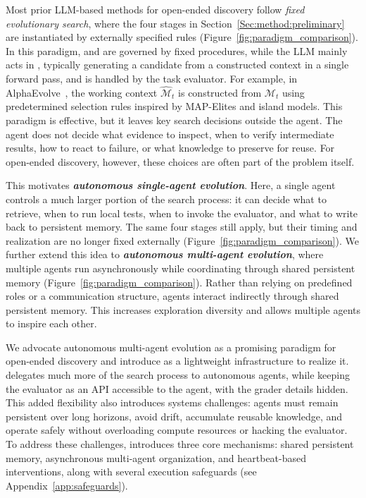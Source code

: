 

Most prior LLM-based methods for open-ended discovery follow \emph{fixed evolutionary search}, where the four stages in Section~\ref{Sec:method:preliminary} are instantiated by externally specified rules (Figure~\ref{fig:paradigm_comparison}). In this paradigm,  and  are governed by fixed procedures, while the LLM mainly acts in , typically generating a candidate from a constructed context in a single forward pass, and  is handled by the task evaluator. For example, in AlphaEvolve~\citep{novikov2025alphaevolve}, the working context $\hat{\mathcal{M}}_t$ is constructed from $\mathcal{M}_t$ using predetermined selection rules inspired by MAP-Elites and island models. This paradigm is effective, but it leaves key search decisions outside the agent. The agent does not decide what evidence to inspect, when to verify intermediate results, how to react to failure, or what knowledge to preserve for reuse. For open-ended discovery, however, these choices are often part of the problem itself.

This motivates \textbf{\emph{autonomous single-agent evolution}}. Here, a single agent controls a much larger portion of the search process: it can decide what to retrieve, when to run local tests, when to invoke the evaluator, and what to write back to persistent memory. The same four stages still apply, but their timing and realization are no longer fixed externally (Figure~\ref{fig:paradigm_comparison}). We further extend this idea to \textbf{\emph{autonomous multi-agent evolution}}, where multiple agents run asynchronously while coordinating through shared persistent memory (Figure~\ref{fig:paradigm_comparison}). Rather than relying on predefined roles or a communication structure, agents interact indirectly through shared persistent memory. This increases exploration diversity and allows multiple agents to inspire each other.

We advocate autonomous multi-agent evolution as a promising paradigm for open-ended discovery and introduce \method{} as a lightweight infrastructure to realize it. \method{} delegates much more of the search process to autonomous agents, while keeping the evaluator as an API accessible to the agent, with the grader details hidden.
This added flexibility also introduces systems challenges: agents must remain persistent over long horizons, avoid drift, accumulate reusable knowledge, and operate safely without overloading compute resources or hacking the evaluator. To address these challenges, \method{} introduces three core mechanisms: shared persistent memory, asynchronous multi-agent organization, and heartbeat-based interventions, along with several execution safeguards (see Appendix~\ref{app:safeguards}).

